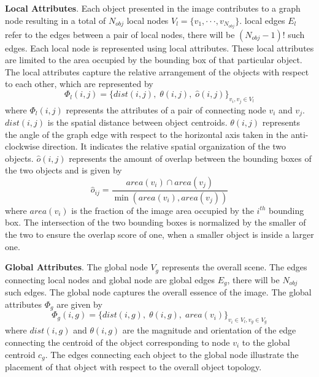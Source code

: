 \documentclass[10pt,twocolumn,letterpaper]{article}
\begin{document}
\textbf{Local Attributes}. Each object presented in the image contributes to a graph node resulting in a total of $N_{obj}$ local nodes ${V_{l}} = \{ {v_1}, \cdot  \cdot  \cdot ,{v_{{N_{obj}}}}\} $. local edges $E_{l}$ refer to the edges between a pair of local nodes, there will be $({N_{obj}} - 1)!$ such edges. Each local node is represented using local attributes. These local attributes are limited to the area occupied by the bounding box of that particular object. The local attributes capture the relative arrangement of the objects with respect to each other, which are represented by 
\begin{equation}
{\Phi _{l}}(i,j) = {\{ dist(i,j),\;\theta (i,j),\;\hat o(i,j)\} _{{v_i},{v_j} \in {V_{l}}}}
\end{equation}
where ${\Phi _{l}}(i,j)$ represents the attributes of a pair of connecting node $v_i$ and $v_j$. $dist(i,j)$ is the spatial distance between object centroids. $\theta(i,j)$ represents the angle of the graph edge with respect to the horizontal axis taken in the anti-clockwise direction. It indicates the relative spatial organization of the two objects. $\hat o(i,j)$ represents the amount of overlap between the bounding boxes of the two objects and is given by 
\begin{equation}
{\hat o_{ij}} = \frac{{area({v_i}) \cap area({v_j})}}{{\min (area({v_i}),area({v_j}))}}
\end{equation}
where ${area({v_i})}$ is the fraction of the image area occupied by the ${i^{th}}$ bounding box. The intersection of the two bounding boxes is normalized by the smaller of the two to ensure the overlap score of one, when a smaller object is inside a larger one.

\textbf{Global Attributes}. The global node $V_{g}$ represents the overall scene. The edges connecting local nodes and global node are global edges $E_{g}$, there will be $N_{obj}$ such edges.
The global node captures the overall essence of the image. The global attributes ${\Phi_{g}}$ are given by
\begin{equation}
{\Phi _g}(i,g) = {\{ dist(i,g),\;\theta (i,g),\;area({v_i})\} _{{v_i} \in {V_l},{v_g} \in {V_g}}}
\end{equation}
where $dist(i,g)$ and $\theta (i,g)$ are the magnitude and orientation of the edge connecting the centroid of the object corresponding to node $v_i$ to the global centroid $c_g$. The edges connecting each object to the global node illustrate the placement of that object with respect to the overall object topology. 
\end{document}
